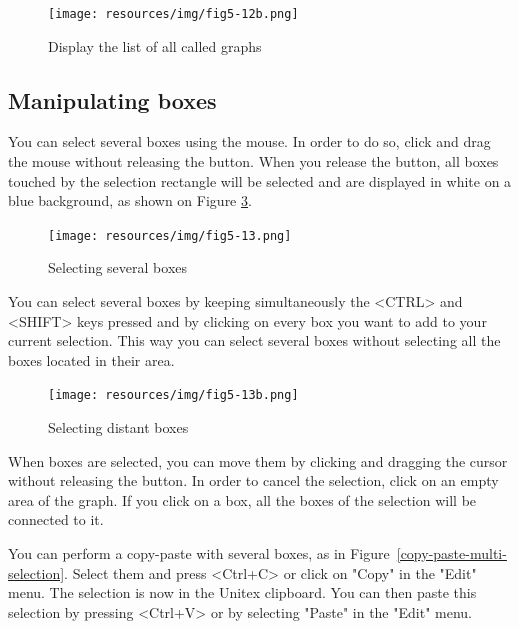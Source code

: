 \begin{figure}[!ht]
\begin{center}
\texttt{[image: resources/img/fig5-12b.png]}
\caption{Display the list of all called graphs\label{list-called-graphs}}
\end{center}
\end{figure}

\subsection{Manipulating boxes}

You can select several boxes using the mouse. In order to do so, click and drag the
mouse without releasing the button. When you release the button, all boxes
touched by the selection rectangle will be selected and are displayed in
white on a blue background, as shown on Figure \ref{multi-selection}.

\begin{figure}[!ht]
\begin{center}
\texttt{[image: resources/img/fig5-13.png]}
\caption{Selecting several boxes\label{multi-selection}}
\end{center}
\end{figure}
\noindent You can select several boxes by keeping simultaneously the <CTRL> and <SHIFT> keys pressed and by clicking on every box you want to add to your current selection. This way you can select several boxes without selecting all the boxes located in their area.

\begin{figure}[!ht]
\begin{center}
\texttt{[image: resources/img/fig5-13b.png]}
\caption{Selecting distant boxes\label{multi-selection}}
\end{center}
\end{figure}
\bigskip
\noindent When boxes are selected, you can move them by clicking and
dragging the cursor without releasing the button. In order to cancel the selection, click on
an empty area of the graph. If you click on a box, all the boxes of the selection
will be connected to it.

\bigskip
{}
\noindent You can perform a copy-paste with several boxes, as in
Figure~\ref{copy-paste-multi-selection}. Select them and
press <Ctrl+C> or click on "Copy" in the "Edit" menu. The selection is now in the Unitex
clipboard. You can then paste this selection by pressing <Ctrl+V> or by selecting
"Paste" in the "Edit" menu.

